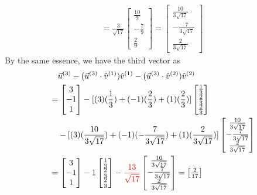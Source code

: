 \begin{solution}
\begin{align*}
=
\frac{3}{\sqrt{17}}
\begin{bmatrix}
\frac{10}{9} \\
-\frac{7}{9} \\
\frac{2}{9}
\end{bmatrix}
=
\begin{bmatrix}
\frac{10}{3\sqrt{17}} \\
-\frac{7}{3\sqrt{17}}\\
\frac{2}{3\sqrt{17}}
\end{bmatrix}
\end{align*}
By the same essence, we have the third vector as
\begin{align*}
&\quad \vec{u}^{(3)} - (\vec{u}^{(3)} \cdot \hat{v}^{(1)})\hat{v}^{(1)} - (\vec{u}^{(3)} \cdot \hat{v}^{(2)})\hat{v}^{(2)}\\
&=
\begin{bmatrix}
3 \\
-1 \\
1
\end{bmatrix}
-
[(3)(\frac{1}{3}) + (-1)(\frac{2}{3}) + (1)(\frac{2}{3})]
\begin{bmatrix}
\frac{1}{3} \\
\frac{2}{3} \\
\frac{2}{3}
\end{bmatrix} \\
&\quad -
[(3)(\frac{10}{3\sqrt{17}}) + (-1)(-\frac{7}{3\sqrt{17}}) + (1)(\frac{2}{3\sqrt{17}})]
\begin{bmatrix}
\frac{10}{3\sqrt{17}} \\
-\frac{7}{3\sqrt{17}} \\
\frac{2}{3\sqrt{17}}
\end{bmatrix} \\
&=
\begin{bmatrix}
3 \\
-1 \\
1
\end{bmatrix}
- 1
\begin{bmatrix}
\frac{1}{3} \\
\frac{2}{3} \\
\frac{2}{3}
\end{bmatrix}
-
\textcolor{red}{\frac{13}{\sqrt{17}}}
\begin{bmatrix}
\frac{10}{3\sqrt{17}} \\
-\frac{7}{3\sqrt{17}} \\
\frac{2}{3\sqrt{17}}
\end{bmatrix}
=
\begin{bmatrix}
\frac{2}{17} \\

\end{bmatrix}
\end{align*}
\end{solution}

